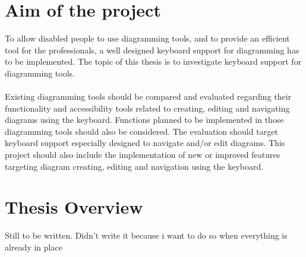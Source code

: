 \section{Aim of the project}
To allow disabled people to use diagramming tools, and to provide an efficient tool for the professionals, a well designed keyboard support for diagramming has to be implemented.
The topic of this thesis is to investigate keyboard support for diagramming tools.

\paragraph{}
Existing diagramming tools should be compared and evaluated regarding their functionality and accessibility tools related to creating, editing and navigating diagrams using the keyboard. Functions planned to be implemented in those diagramming tools should also be considered. The evaluation should target keyboard support especially designed to navigate and/or edit diagrams.
This project should also include the implementation of new or improved features targeting diagram creating, editing and navigation using the keyboard.

\section{Thesis Overview}
Still to be written. Didn't write it because i want to do so when everything is already in place


